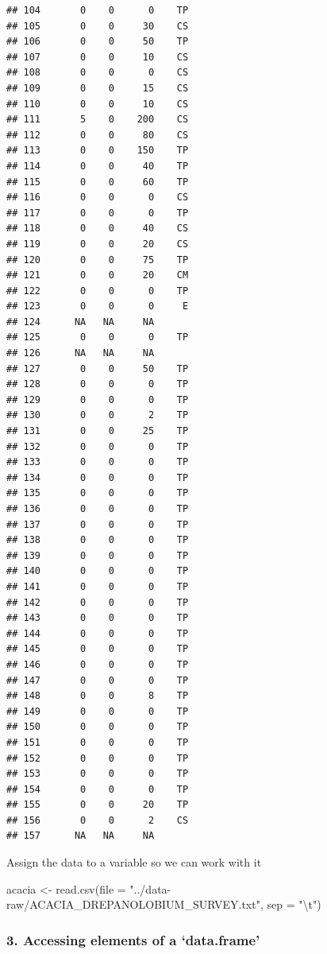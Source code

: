 \documentclass[
]{article}
\newenvironment{Shaded}{\begin{snugshade}}{\end{snugshade}}
\newcommand{\AttributeTok}[1]{\textcolor[rgb]{0.77,0.63,0.00}{#1}}
\newcommand{\FunctionTok}[1]{\textcolor[rgb]{0.00,0.00,0.00}{#1}}
\newcommand{\NormalTok}[1]{#1}
\newcommand{\OtherTok}[1]{\textcolor[rgb]{0.56,0.35,0.01}{#1}}
\newcommand{\SpecialCharTok}[1]{\textcolor[rgb]{0.00,0.00,0.00}{#1}}
\newcommand{\StringTok}[1]{\textcolor[rgb]{0.31,0.60,0.02}{#1}}
\begin{document}
\begin{verbatim}
## 104       0    0      0    TP
## 105       0    0     30    CS
## 106       0    0     50    TP
## 107       0    0     10    CS
## 108       0    0      0    CS
## 109       0    0     15    CS
## 110       0    0     10    CS
## 111       5    0    200    CS
## 112       0    0     80    CS
## 113       0    0    150    TP
## 114       0    0     40    TP
## 115       0    0     60    TP
## 116       0    0      0    CS
## 117       0    0      0    TP
## 118       0    0     40    CS
## 119       0    0     20    CS
## 120       0    0     75    TP
## 121       0    0     20    CM
## 122       0    0      0    TP
## 123       0    0      0     E
## 124      NA   NA     NA      
## 125       0    0      0    TP
## 126      NA   NA     NA      
## 127       0    0     50    TP
## 128       0    0      0    TP
## 129       0    0      0    TP
## 130       0    0      2    TP
## 131       0    0     25    TP
## 132       0    0      0    TP
## 133       0    0      0    TP
## 134       0    0      0    TP
## 135       0    0      0    TP
## 136       0    0      0    TP
## 137       0    0      0    TP
## 138       0    0      0    TP
## 139       0    0      0    TP
## 140       0    0      0    TP
## 141       0    0      0    TP
## 142       0    0      0    TP
## 143       0    0      0    TP
## 144       0    0      0    TP
## 145       0    0      0    TP
## 146       0    0      0    TP
## 147       0    0      0    TP
## 148       0    0      8    TP
## 149       0    0      0    TP
## 150       0    0      0    TP
## 151       0    0      0    TP
## 152       0    0      0    TP
## 153       0    0      0    TP
## 154       0    0      0    TP
## 155       0    0     20    TP
## 156       0    0      2    CS
## 157      NA   NA     NA
\end{verbatim}

Assign the data to a variable so we can work with it

\begin{Shaded}
\begin{Highlighting}[]
\NormalTok{acacia }\OtherTok{\textless{}{-}} \FunctionTok{read.csv}\NormalTok{(}\AttributeTok{file =} \StringTok{"../data{-}raw/ACACIA\_DREPANOLOBIUM\_SURVEY.txt"}\NormalTok{, }\AttributeTok{sep =} \StringTok{"}\SpecialCharTok{\textbackslash{}t}\StringTok{"}\NormalTok{)}
\end{Highlighting}
\end{Shaded}

\hypertarget{accessing-elements-of-a-data.frame}{%
\subsubsection{3. Accessing elements of a
`data.frame'}\label{accessing-elements-of-a-data.frame}}
\end{document}

